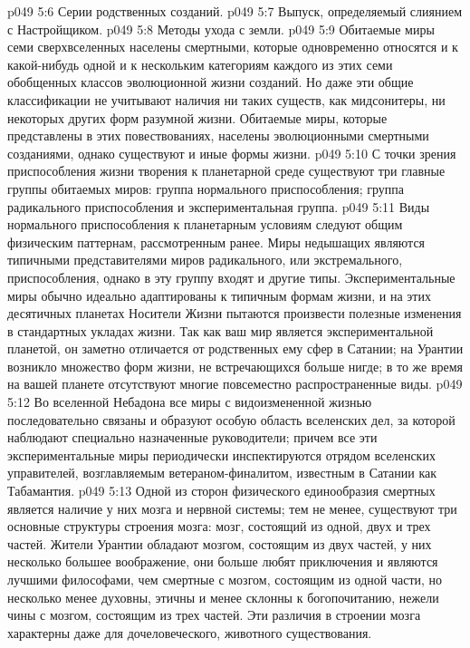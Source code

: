 \vs p049 5:6 \bibnobreakspace Серии родственных созданий.
\vs p049 5:7 \bibnobreakspace Выпуск, определяемый слиянием с Настройщиком.
\vs p049 5:8 \bibnobreakspace Методы ухода с земли.
\vs p049 5:9 \pc Обитаемые миры семи сверхвселенных населены смертными, которые одновременно относятся и к какой\hyp{}нибудь одной и к нескольким категориям каждого из этих семи обобщенных классов эволюционной жизни созданий. Но даже эти общие классификации не учитывают наличия ни таких существ, как мидсонитеры, ни некоторых других форм разумной жизни. Обитаемые миры, которые представлены в этих повествованиях, населены эволюционными смертными созданиями, однако существуют и иные формы жизни.
\vs p049 5:10 \pc {}\bibnobreakspace {} С точки зрения приспособления жизни творения к планетарной среде существуют три главные группы обитаемых миров: группа нормального приспособления; группа радикального приспособления и экспериментальная группа.
\vs p049 5:11 Виды нормального приспособления к планетарным условиям следуют общим физическим паттернам, рассмотренным ранее. Миры недышащих являются типичными представителями миров радикального, или экстремального, приспособления, однако в эту группу входят и другие типы. Экспериментальные миры обычно идеально адаптированы к типичным формам жизни, и на этих десятичных планетах Носители Жизни пытаются произвести полезные изменения в стандартных укладах жизни. Так как ваш мир является экспериментальной планетой, он заметно отличается от родственных ему сфер в Сатании; на Урантии возникло множество форм жизни, не встречающихся больше нигде; в то же время на вашей планете отсутствуют многие повсеместно распространенные виды.
\vs p049 5:12 Во вселенной Небадона все миры с видоизмененной жизнью последовательно связаны и образуют особую область вселенских дел, за которой наблюдают специально назначенные руководители; причем все эти экспериментальные миры периодически инспектируются отрядом вселенских управителей, возглавляемым ветераном\hyp{}финалитом, известным в Сатании как Табамантия.
\vs p049 5:13 \pc {}\bibnobreakspace {} Одной из сторон физического единообразия смертных является наличие у них мозга и нервной системы; тем не менее, существуют три основные структуры строения мозга: мозг, состоящий из одной, двух и трех частей. Жители Урантии обладают мозгом, состоящим из двух частей, у них несколько большее воображение, они больше любят приключения и являются лучшими философами, чем смертные с мозгом, состоящим из одной части, но несколько менее духовны, этичны и менее склонны к богопочитанию, нежели чины с мозгом, состоящим из трех частей. Эти различия в строении мозга характерны даже для дочеловеческого, животного существования.
